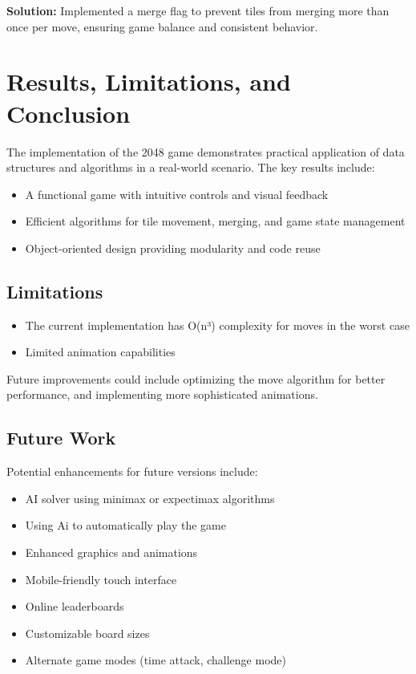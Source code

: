 \documentclass[12pt, a4paper]{article}
\begin{document}
\textbf{Solution:} Implemented a merge flag to prevent tiles from merging more than once per move, ensuring game balance and consistent behavior.

\section{Results, Limitations, and Conclusion}
The implementation of the 2048 game demonstrates practical application of data structures and algorithms in a real-world scenario. The key results include:
\begin{itemize}
    \item A functional game with intuitive controls and visual feedback
    \item Efficient algorithms for tile movement, merging, and game state management
    \item Object-oriented design providing modularity and code reuse
\end{itemize}

\subsection{Limitations}
\begin{itemize}
    \item The current implementation has O(n³) complexity for moves in the worst case
    \item Limited animation capabilities
\end{itemize}

Future improvements could include optimizing the move algorithm for better performance, and implementing more sophisticated animations.

\subsection{Future Work}
Potential enhancements for future versions include:
\begin{itemize}
    \item AI solver using minimax or expectimax algorithms
    \item Using Ai to automatically play the game
    \item Enhanced graphics and animations
    \item Mobile-friendly touch interface
    \item Online leaderboards
    \item Customizable board sizes
    \item Alternate game modes (time attack, challenge mode)
\end{itemize}
\end{document}
